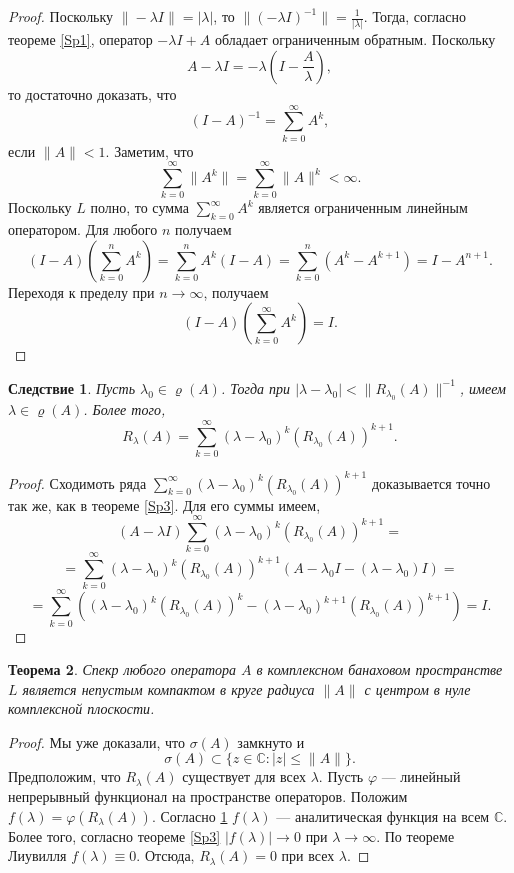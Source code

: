 \documentclass[12pt, titlepage, oneside]{amsbook}
\newcommand{\CC}{\mathbb{C}}
\newtheorem{theorem}{Теорема}[chapter]
\newtheorem{corollary}[theorem]{Следствие}
\theoremstyle{definition}
\theoremstyle{remark}
\begin{document}
\begin{proof}
	Поскольку $\|-\lambda I\|=|\lambda|$, то $\|(-\lambda I)^{-1}\|=\frac{1}{|\lambda|}$. Тогда, согласно теореме \ref{Sp1}, оператор $-\lambda I+A$ обладает ограниченным обратным. Поскольку $$A-\lambda I=-\lambda(I-\frac{A}{\lambda}),$$ то достаточно доказать, что $$(I-A)^{-1}=\sum\limits_{k=0}^{\infty} A^k,$$ если $\|A\|<1$. Заметим, что $$\sum\limits_{k=0}^{\infty} \|A^k\|=\sum\limits_{k=0}^{\infty}\|A\|^k<\infty.$$ Поскольку $L$ полно, то сумма $\sum\limits_{k=0}^{\infty} A^k$ является ограниченным линейным оператором. Для любого $n$ получаем $$(I-A)\left(\sum\limits_{k=0}^{n} A^k\right)=\sum\limits_{k=0}^{n} A^k(I-A)=\sum\limits_{k=0}^{n} (A^k-A^{k+1})=I-A^{n+1}.$$ Переходя к пределу при $n\rightarrow\infty$, получаем $$(I-A)\left(\sum\limits_{k=0}^{\infty} A^k\right)=I.$$
\end{proof}


\begin{corollary}
	\label{Sp4}
	Пусть $\lambda_0\in\varrho(A)$. Тогда при $|\lambda-\lambda_0|<\|R_{\lambda_0}(A)\|^{-1}$, имеем $\lambda\in\varrho(A)$. Более того, $$R_{\lambda}(A)=\sum\limits_{k=0}^{\infty}(\lambda-\lambda_0)^k(R_{\lambda_0}(A))^{k+1}.$$
\end{corollary}

\begin{proof}
	Сходимоть ряда $\sum\limits_{k=0}^{\infty}(\lambda-\lambda_0)^k(R_{\lambda_0}(A))^{k+1}$ доказывается точно так же, как в теореме \ref{Sp3}. Для его суммы имеем, $$(A-\lambda I)\sum\limits_{k=0}^{\infty}(\lambda-\lambda_0)^k(R_{\lambda_0}(A))^{k+1}=$$ $$=\sum\limits_{k=0}^{\infty}(\lambda-\lambda_0)^k(R_{\lambda_0}(A))^{k+1}(A-\lambda_0I-(\lambda-\lambda_0)I)=$$ $$=\sum\limits_{k=0}^{\infty}\left((\lambda-\lambda_0)^k(R_{\lambda_0}(A))^{k}-(\lambda-\lambda_0)^{k+1}(R_{\lambda_0}(A))^{k+1}\right)=I.$$
\end{proof}

\begin{theorem}
	\label{Sp5}
	Спекр любого оператора $A$ в комплексном банаховом пространстве $L$ является непустым компактом в круге радиуса $\|A\|$ с центром в нуле комплексной плоскости.
\end{theorem}

\begin{proof}
	Мы уже доказали, что $\sigma(A)$ замкнуто и $$\sigma(A)\subset\{z\in\CC:|z|\leq\|A\|\}.$$ Предположим, что $R_{\lambda}(A)$ существует для всех $\lambda$. Пусть $\varphi$ --- линейный непрерывный функционал на пространстве операторов. Положим $f(\lambda)=\varphi(R_{\lambda}(A))$. Согласно \ref{Sp4} $f(\lambda)$ --- аналитическая функция на всем $\CC$. Более того, согласно теореме \ref{Sp3} $|f(\lambda)|\rightarrow 0$ при $\lambda\rightarrow\infty$. По теореме Лиувилля $f(\lambda)\equiv 0$. Отсюда, $R_{\lambda}(A)=0$ при всех $\lambda$.
\end{proof}
\end{document}
